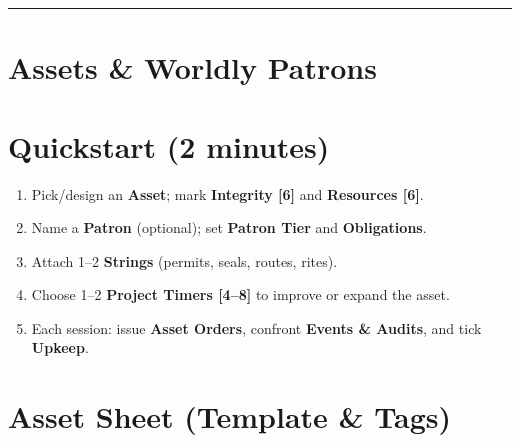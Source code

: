 \documentclass[10pt]{article}
\begin{document}
\begin{center}
\rule{0.8\textwidth}{0.4pt}
\end{center}

\begin{center}
    \section{Assets \& Worldly Patrons}
    

    \section*{Quickstart (2 minutes)}
    \begin{enumerate}
      \item Pick/design an \textbf{Asset}; mark \textbf{Integrity [6]} and \textbf{Resources [6]}.
      \item Name a \textbf{Patron} (optional); set \textbf{Patron Tier} and \textbf{Obligations}.
      \item Attach 1--2 \textbf{Strings} (permits, seals, routes, rites).
      \item Choose 1--2 \textbf{Project Timers [4--8]} to improve or expand the asset.
      \item Each session: issue \textbf{Asset Orders}, confront \textbf{Events \& Audits}, and tick \textbf{Upkeep}.
    \end{enumerate}
    
    \newpage
    
    \section{Asset Sheet (Template \& Tags)}

\end{center}
\end{document}
